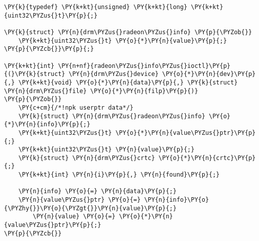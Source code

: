 \begin{Verbatim}[commandchars=\\\{\}]
\PY{k}{typedef} \PY{k+kt}{unsigned} \PY{k+kt}{long} \PY{k+kt}{uint32\PYZus{}t}\PY{p}{;}

\PY{k}{struct} \PY{n}{drm\PYZus{}radeon\PYZus{}info} \PY{p}{\PYZob{}}
    \PY{k+kt}{uint32\PYZus{}t} \PY{o}{*}\PY{n}{value}\PY{p}{;}
\PY{p}{\PYZcb{}}\PY{p}{;}

\PY{k+kt}{int} \PY{n+nf}{radeon\PYZus{}info\PYZus{}ioctl}\PY{p}{(}\PY{k}{struct} \PY{n}{drm\PYZus{}device} \PY{o}{*}\PY{n}{dev}\PY{p}{,} \PY{k+kt}{void} \PY{o}{*}\PY{n}{data}\PY{p}{,} \PY{k}{struct} \PY{n}{drm\PYZus{}file} \PY{o}{*}\PY{n}{filp}\PY{p}{)}
\PY{p}{\PYZob{}}
	\PY{c+cm}{/*!npk userptr data*/}
	\PY{k}{struct} \PY{n}{drm\PYZus{}radeon\PYZus{}info} \PY{o}{*}\PY{n}{info}\PY{p}{;}
	\PY{k+kt}{uint32\PYZus{}t} \PY{o}{*}\PY{n}{value\PYZus{}ptr}\PY{p}{;}
	\PY{k+kt}{uint32\PYZus{}t} \PY{n}{value}\PY{p}{;}
	\PY{k}{struct} \PY{n}{drm\PYZus{}crtc} \PY{o}{*}\PY{n}{crtc}\PY{p}{;}
	\PY{k+kt}{int} \PY{n}{i}\PY{p}{,} \PY{n}{found}\PY{p}{;}

	\PY{n}{info} \PY{o}{=} \PY{n}{data}\PY{p}{;}
	\PY{n}{value\PYZus{}ptr} \PY{o}{=} \PY{n}{info}\PY{o}{\PYZhy{}}\PY{o}{\PYZgt{}}\PY{n}{value}\PY{p}{;}
        \PY{n}{value} \PY{o}{=} \PY{o}{*}\PY{n}{value\PYZus{}ptr}\PY{p}{;}
\PY{p}{\PYZcb{}}
\end{Verbatim}
